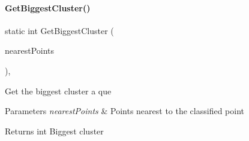 \paragraph{\texorpdfstring{Get\+Biggest\+Cluster()}{GetBiggestCluster()}}
{\footnotesize\ttfamily static int Get\+Biggest\+Cluster (\begin{DoxyParamCaption}\item[{\hyperlink{classDataTools_1_1utils_1_1PriorityQue}{Priority\+Que}$<$ \hyperlink{classDataTools_1_1clustering_1_1ClusterPoint}{Cluster\+Point} $>$}]{nearest\+Points }\end{DoxyParamCaption})\hspace{0.3cm}{\ttfamily [static]}, {\ttfamily [private]}}

Get the biggest cluster a que 
\begin{DoxyParams}{Parameters}
{\em nearest\+Points} & Points nearest to the classified point \\
\hline
\end{DoxyParams}
\begin{DoxyReturn}{Returns}
int Biggest cluster 
\end{DoxyReturn}
